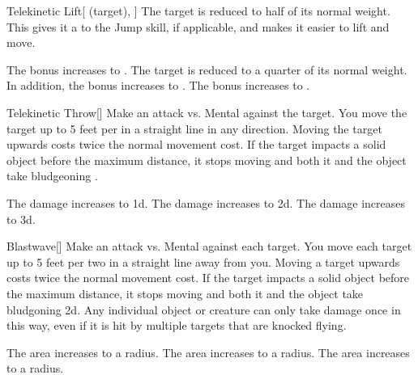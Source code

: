 \lowercase{\hypertarget{spell:Telekinetic Lift}{}}\label{spell:Telekinetic Lift}
\begin{attuneability}[Rank 1]{\hypertarget{spell:Telekinetic Lift}{Telekinetic Lift}}[ (target), ]
The target is reduced to half of its normal weight.
This gives it a   to the Jump skill, if applicable, and makes it easier to lift and move.

\rankline
{} The bonus increases to .
 The target is reduced to a quarter of its normal weight. In addition, the bonus increases to .
 The bonus increases to .
\end{attuneability}
\vspace{0.25em}



\lowercase{\hypertarget{spell:Telekinetic Throw}{}}\label{spell:Telekinetic Throw}
\begin{freeability}[Rank 1]{\hypertarget{spell:Telekinetic Throw}{Telekinetic Throw}}[]
Make an attack vs. Mental against the target.
\hit You move the target up to 5 feet per  in a straight line in any direction.
Moving the target upwards costs twice the normal movement cost.
If the target impacts a solid object before the maximum distance, it stops moving and both it and the object take bludgeoning .

\rankline
{} The damage increases to  \plus1d.
 The damage increases to  \plus2d.
 The damage increases to  \plus3d.
\end{freeability}
\vspace{0.25em}



\lowercase{\hypertarget{spell:Blastwave}{}}\label{spell:Blastwave}
\begin{freeability}[Rank 3]{\hypertarget{spell:Blastwave}{Blastwave}}[]
Make an attack vs. Mental against each target.
\hit You move each target up to 5 feet per two  in a straight line away from you.
Moving a target upwards costs twice the normal movement cost.
If the target impacts a solid object before the maximum distance, it stops moving and both it and the object take bludgoning  \minus2d.
Any individual object or creature can only take damage once in this way, even if it is hit by multiple targets that are knocked flying.

\rankline
{} The area increases to a \arealarge radius.
 The area increases to a \areahuge radius.
 The area increases to a \areaext radius.
\end{freeability}
\vspace{0.25em}



